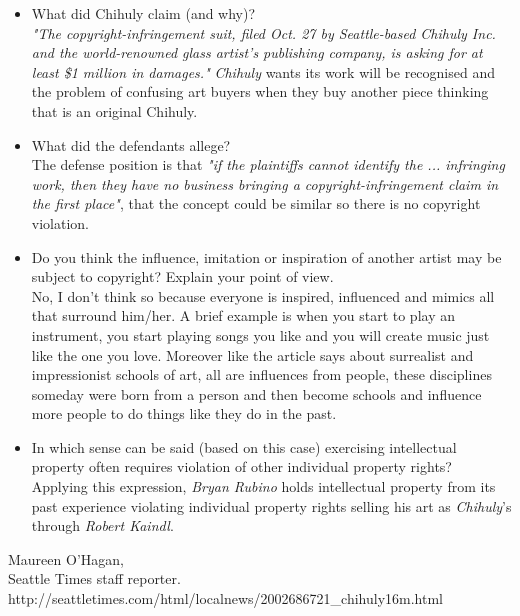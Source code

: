 \documentclass[11pt]{scrartcl}
\begin{document}
\begin{itemize}

	\item What did Chihuly claim (and why)?\\
		\emph{"The copyright-infringement suit, filed Oct. 27 by Seattle-based Chihuly Inc. and the world-renowned glass artist's publishing company, is asking for at least \$1 million in damages."}
		\emph{Chihuly} wants its work will be recognised and the problem of confusing art buyers when they buy another piece thinking that is an original Chihuly.
	\item What did the defendants allege?\\
		The defense position is that \emph{"if the plaintiffs cannot identify the ... infringing work, then they have no business bringing a copyright-infringement claim in the first place"}, that the concept could be similar so there is no copyright violation.
	\item Do you think the influence, imitation or inspiration of another artist may be subject to copyright? Explain your point of view.\\
		No, I don't think so because everyone is inspired, influenced and mimics all that surround him/her. A brief example is when you start to play an instrument, you start playing songs you like and you will create music just like the one you love. Moreover like the article says about surrealist and impressionist schools of art, all are influences from people, these disciplines someday were born from a person and then become schools and influence more people to do things like they do in the past.

	\item In which sense can be said (based on this case) exercising intellectual property often requires violation of other individual property rights?\\
		Applying this expression, \emph{Bryan Rubino} holds intellectual property from its past experience violating individual property rights selling his art as \emph{Chihuly}'s through \emph{Robert Kaindl}.
		
\end{itemize}

\begin{thebibliography}{9}

  Maureen O'Hagan,\\
  Seattle Times staff reporter.\\
  http://seattletimes.com/html/localnews/2002686721\_chihuly16m.html

\end{thebibliography}
\end{document}

